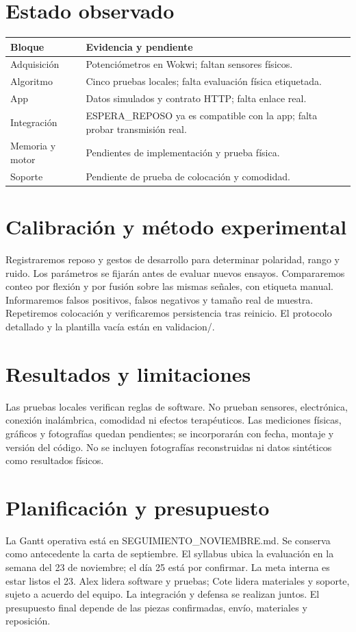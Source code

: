 \documentclass[11pt,a4paper]{article}
\begin{document}
\section{Estado observado}
\begin{longtable}{p{}p{}}\toprule
Bloque & Evidencia y pendiente\\\midrule
Adquisición & Potenciómetros en Wokwi; faltan sensores físicos.\\
Algoritmo & Cinco pruebas locales; falta evaluación física etiquetada.\\
App & Datos simulados y contrato HTTP; falta enlace real.\\
Integración & ESPERA\_REPOSO ya es compatible con la app; falta probar transmisión real.\\
Memoria y motor & Pendientes de implementación y prueba física.\\
Soporte & Pendiente de prueba de colocación y comodidad.\\\bottomrule
\end{longtable}
\section{Calibración y método experimental}
Registraremos reposo y gestos de desarrollo para determinar polaridad, rango y ruido. Los parámetros se fijarán antes de evaluar nuevos ensayos. Compararemos conteo por flexión y por fusión sobre las mismas señales, con etiqueta manual. Informaremos falsos positivos, falsos negativos y tamaño real de muestra. Repetiremos colocación y verificaremos persistencia tras reinicio. El protocolo detallado y la plantilla vacía están en validacion/.
\section{Resultados y limitaciones}
Las pruebas locales verifican reglas de software. No prueban sensores, electrónica, conexión inalámbrica, comodidad ni efectos terapéuticos. Las mediciones físicas, gráficos y fotografías quedan pendientes; se incorporarán con fecha, montaje y versión del código. No se incluyen fotografías reconstruidas ni datos sintéticos como resultados físicos.
\section{Planificación y presupuesto}
La Gantt operativa está en SEGUIMIENTO\_NOVIEMBRE.md. Se conserva como antecedente la carta de septiembre. El syllabus ubica la evaluación en la semana del 23 de noviembre; el día 25 está por confirmar. La meta interna es estar listos el 23. Alex lidera software y pruebas; Cote lidera materiales y soporte, sujeto a acuerdo del equipo. La integración y defensa se realizan juntos. El presupuesto final depende de las piezas confirmadas, envío, materiales y reposición.
\end{document}

